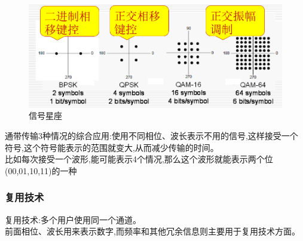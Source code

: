 \documentclass[UTF8,a4paper]{ctexart}
\begin{document}
\begin{figure}[H]
  \centering
  \includegraphics[scale = 0.3]{assets/jisuanjiwangluo_fe463.png}
  \caption{信号星座}
\end{figure}

  通带传输3种情况的综合应用:使用不同相位、波长表示不用的信号,这样接受一个符号,这个符号能表示的范围就变大,从而减少传输的时间。\\
  比如每次接受一个波形,能可能表示4个情况,那么这个波形就能表示两个位(00,01,10,11)的一种

  \subsubsection{复用技术}
  复用技术:多个用户使用同一个通道。\\
  前面相位、波长用来表示数字,而频率和其他冗余信息则主要用于复用技术方面。
\end{document}
